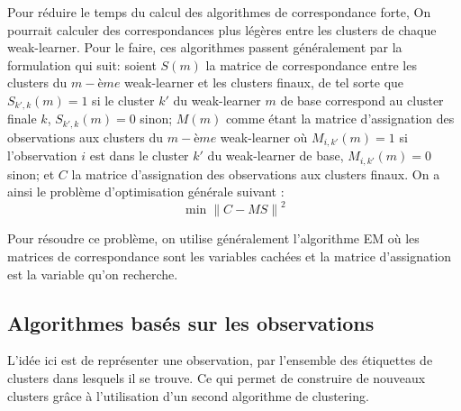   	  Pour réduire le temps du calcul des algorithmes de correspondance forte,
  	  On pourrait calculer des correspondances plus légères entre les clusters de chaque weak-learner. Pour le faire, ces algorithmes passent généralement par la formulation qui suit:
           soient $S(m)$ la matrice de correspondance entre les clusters du $m-ème$ weak-learner et les clusters finaux, de tel sorte que
  	  $S_{k',k}(m) = 1$ si le cluster $k'$ du weak-learner $m$ de base correspond au cluster finale $k$,
  	  $S_{k',k}(m) = 0$ sinon; $M(m)$ comme étant la matrice d'assignation des observations aux clusters du $m-ème$ weak-learner où
  	  $M_{i,k'}(m) = 1$ si l'observation $i$ est dans le cluster $k'$ du weak-learner de base,
  	  $M_{i,k'}(m) = 0$ sinon; et $C$ la matrice d'assignation des observations aux clusters finaux.
  	  On a ainsi le problème d'optimisation générale suivant :
  	  \begin{equation}
  		  \min {\| C - MS \|}^2
  	  \end{equation}

  	  Pour résoudre ce problème, on utilise généralement l'algorithme EM %
      où les matrices de correspondance sont les variables cachées et la matrice d'assignation est la variable qu'on recherche.
    
  	  \subsection{Algorithmes basés sur les observations}
      
  	  L'idée ici est de représenter une observation, par l'ensemble des étiquettes de clusters dans lesquels il se trouve. Ce qui permet de construire de nouveaux clusters grâce à l'utilisation d'un second algorithme de clustering.
    
    
